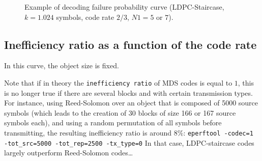 \documentclass[a4paper,11pt]{article}
\begin{document}
{\begin{figure}[ht]
        \centering
	\caption{Example of decoding failure probability curve (LDPC-Staircase, $k=1.024$ symbols,
		code rate $2/3$, $N1=5$ or $7$).}
        \label{fig:failure_proba}
\end{figure}


\subsection{Inefficiency ratio as a function of the code rate}

In this curve, the object size is fixed.

Note that if in theory the \verb+inefficiency ratio+ of MDS codes is equal to $1$, this is
no longer true if there are several blocks and with certain transmission types.
For instance, using Reed-Solomon over an object that is composed of 5000 source symbols
(which leads to the creation of 30 blocks of size 166 or 167 source symbols each), and
using a random permutation of all symbols before transmitting, the resulting inefficiency
ratio is around $8\%$:
\verb+eperftool -codec=1 -tot_src=5000 -tot_rep=2500 -tx_type=0+
In that case, LDPC-staircase codes largely outperform Reed-Solomon codes\ldots


}
\end{document}
